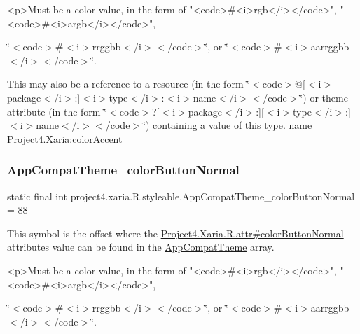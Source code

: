 \begin{DoxyVerb}      <p>Must be a color value, in the form of "<code>#<i>rgb</i></code>", "<code>#<i>argb</i></code>",
\end{DoxyVerb}
 \char`\"{}$<$code$>$\#$<$i$>$rrggbb$<$/i$>$$<$/code$>$\char`\"{}, or \char`\"{}$<$code$>$\#$<$i$>$aarrggbb$<$/i$>$$<$/code$>$\char`\"{}. 

This may also be a reference to a resource (in the form \char`\"{}$<$code$>$@\mbox{[}$<$i$>$package$<$/i$>$\+:\mbox{]}$<$i$>$type$<$/i$>$\+:$<$i$>$name$<$/i$>$$<$/code$>$\char`\"{}) or theme attribute (in the form \char`\"{}$<$code$>$?\mbox{[}$<$i$>$package$<$/i$>$\+:\mbox{]}\mbox{[}$<$i$>$type$<$/i$>$\+:\mbox{]}$<$i$>$name$<$/i$>$$<$/code$>$\char`\"{}) containing a value of this type.  name Project4.\+Xaria\+:color\+Accent \mbox{\label{classproject4_1_1xaria_1_1R_1_1styleable_a84437157df751a100d61fc0f2d910f0b}} 
\subsubsection{\texorpdfstring{App\+Compat\+Theme\+\_\+color\+Button\+Normal}{AppCompatTheme\_colorButtonNormal}}
{\footnotesize\ttfamily static final int project4.\+xaria.\+R.\+styleable.\+App\+Compat\+Theme\+\_\+color\+Button\+Normal = 88\hspace{0.3cm}{\ttfamily [static]}}

This symbol is the offset where the \hyperlink{}{Project4.\+Xaria.\+R.\+attr\#color\+Button\+Normal} attribute\textquotesingle{}s value can be found in the \hyperlink{classproject4_1_1xaria_1_1R_1_1styleable_aad8bec413e2350f9404e6ff0e831a85d}{App\+Compat\+Theme} array.

\begin{DoxyVerb}      <p>Must be a color value, in the form of "<code>#<i>rgb</i></code>", "<code>#<i>argb</i></code>",
\end{DoxyVerb}
 \char`\"{}$<$code$>$\#$<$i$>$rrggbb$<$/i$>$$<$/code$>$\char`\"{}, or \char`\"{}$<$code$>$\#$<$i$>$aarrggbb$<$/i$>$$<$/code$>$\char`\"{}. 

